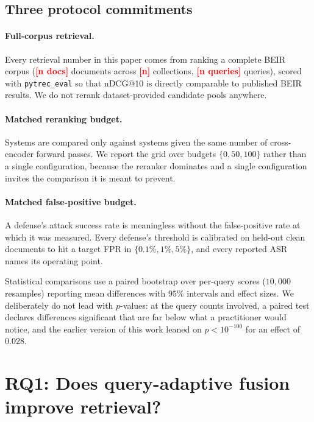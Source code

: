 \documentclass{article}
\providecommand{\PENDING}[1]{\textcolor{red}{\textbf{[#1]}}}
\newcommand{\nBeirCorpora}{\PENDING{n}}
\newcommand{\nBeirDocs}{\PENDING{n docs}}
\newcommand{\nBeirQueries}{\PENDING{n queries}}
\begin{document}
\subsection{Three protocol commitments}

\paragraph{Full-corpus retrieval.} Every retrieval number in this paper comes
from ranking a complete BEIR corpus (\nBeirDocs{} documents across
\nBeirCorpora{} collections, \nBeirQueries{} queries), scored with
\texttt{pytrec\_eval} \citep{vangysel2018pytreceval} so that nDCG@10
\citep{jarvelin2002ndcg} is directly comparable to published BEIR results. We do not rerank dataset-provided candidate pools anywhere.

\paragraph{Matched reranking budget.} Systems are compared only against systems
given the same number of cross-encoder forward passes. We report the grid over
budgets $\{0, 50, 100\}$ rather than a single configuration, because the
reranker dominates and a single configuration invites the comparison it is
meant to prevent.

\paragraph{Matched false-positive budget.} A defense's attack success rate is
meaningless without the false-positive rate at which it was measured. Every
defense's threshold is calibrated on held-out clean documents to hit a target
FPR in $\{0.1\%, 1\%, 5\%\}$, and every reported ASR names its operating point.

Statistical comparisons use a paired bootstrap over per-query scores
($10{,}000$ resamples) reporting mean differences with $95\%$ intervals and
effect sizes. We deliberately do not lead with $p$-values: at the query counts
involved, a paired test declares differences significant that are far below what
a practitioner would notice, and the earlier version of this work leaned on
$p < 10^{-100}$ for an effect of $0.028$.

\section{RQ1: Does query-adaptive fusion improve retrieval?}
\label{sec:rq1}
\end{document}

